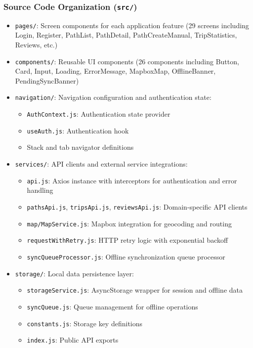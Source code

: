 \subsubsection{Source Code Organization (\texttt{src/})}
\begin{itemize}
    \item \texttt{pages/}: Screen components for each application feature (29 screens including Login, Register, PathList, PathDetail, PathCreateManual, TripStatistics, Reviews, etc.)
    
    \item \texttt{components/}: Reusable UI components (26 components including Button, Card, Input, Loading, ErrorMessage, MapboxMap, OfflineBanner, PendingSyncBanner)
    
    \item \texttt{navigation/}: Navigation configuration and authentication state:
    \begin{itemize}
        \item \texttt{AuthContext.js}: Authentication state provider
        \item \texttt{useAuth.js}: Authentication hook
        \item Stack and tab navigator definitions
    \end{itemize}
    
    \item \texttt{services/}: API clients and external service integrations:
    \begin{itemize}
        \item \texttt{api.js}: Axios instance with interceptors for authentication and error handling
        \item \texttt{pathsApi.js}, \texttt{tripsApi.js}, \texttt{reviewsApi.js}: Domain-specific API clients
        \item \texttt{map/MapService.js}: Mapbox integration for geocoding and routing
        \item \texttt{requestWithRetry.js}: HTTP retry logic with exponential backoff
        \item \texttt{syncQueueProcessor.js}: Offline synchronization queue processor
    \end{itemize}
    
    \item \texttt{storage/}: Local data persistence layer:
    \begin{itemize}
        \item \texttt{storageService.js}: AsyncStorage wrapper for session and offline data
        \item \texttt{syncQueue.js}: Queue management for offline operations
        \item \texttt{constants.js}: Storage key definitions
        \item \texttt{index.js}: Public API exports
    \end{itemize}
    

\end{itemize}
